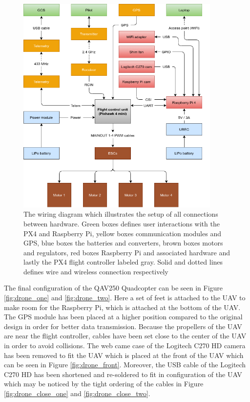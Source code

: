 \documentclass[../Head/report.tex]{subfiles}
\begin{document}
\begin{figure}[H]
    \centering
     \includegraphics[height=11.0cm]{../Figures/power_system/power_system.png}
    \caption{The wiring diagram which illustrates the setup of all connections between hardware. Green boxes defines user interactions with the PX4 and Raspberry Pi, yellow boxes communication modules and GPS, blue boxes the batteries and converters, brown boxes motors and regulators, red boxes Raspberry Pi and associated hardware and lastly the PX4 flight controller labeled gray. Solid and dotted lines defines wire and wireless connection respectively}
    \label{fig:wiring_diagram}
\end{figure}

The final configuration of the QAV250 Quadcopter can be seen in Figure \ref{fig:drone_one} and \ref{fig:drone_two}. Here a set of feet is attached to the UAV to make room for the Raspberry Pi, which is attached at the bottom of the UAV. The GPS module has been placed at a higher position compared to the original design in order for better data transmission. Because the propellers of the UAV are near the flight controller, cables have been set close to the center of the UAV in order to avoid collisions. The web came case of the Logitech C270 HD camera has been removed to fit the UAV which is placed at the front of the UAV which can be seen in Figure \ref{fig:drone_front}. Moreover, the USB cable of the Logitech C270 HD has been shortened and re-soldered to fit in configuration of the UAV which may be noticed by the tight ordering of the cables in Figure \ref{fig:drone_close_one} and \ref{fig:drone_close_two}.    
\end{document}
